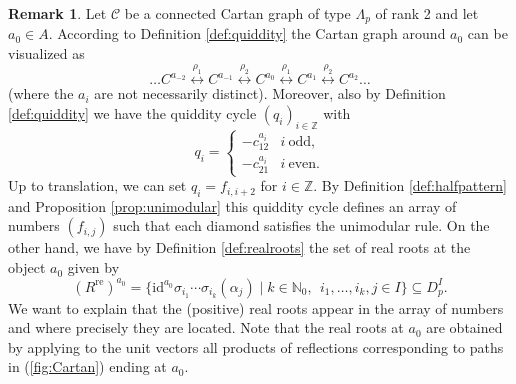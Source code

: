 \documentclass[11pt,a4paper]{amsart}
\theoremstyle{definition}
\newtheorem{Remark}[Lemma]{Remark}
\numberwithin{equation}{section}
\newcommand{\id }{\mathrm{id}}
\newcommand{\re }{^\mathrm{re}}
\newcommand{\rer }[1]{(R\re)^{#1}}
\newcommand{\s }{\sigma }
\newcommand{\Ri}{D_p}
\begin{document}
\begin{Remark} \label{rem:rootsinfrieze}
Let $\mathcal{C}$ be a connected 
Cartan graph of type
$\Lambda_p$ of rank 2 and let $a_0\in A$. 
According to Definition \ref{def:quiddity}
the Cartan graph around $a_0$ can be visualized
as 
\begin{equation} \label{fig:Cartan}
\ldots C^{a_{-2}} \stackrel{\rho_1}{\longleftrightarrow}
C^{a_{-1}} \stackrel{\rho_2}{\longleftrightarrow}
C^{a_0} \stackrel{\rho_1}{\longleftrightarrow}
C^{a_1} 
\stackrel{\rho_2}{\longleftrightarrow}
C^{a_2} \ldots
\end{equation}
(where the $a_i$ are not necessarily distinct). 
Moreover, also by Definition \ref{def:quiddity}
we have the quiddity cycle 
$(q_i)_{i\in \mathbb{Z}}$ with 
$$q_i= \left\{ \begin{array}{ll}
-c_{12}^{a_i} & i~\mathrm{odd}, \\
-c_{21}^{a_i} & i~\mathrm{even}.
\end{array} \right.
$$
Up to translation, 
we can set $q_i=f_{i,i+2}$ for $i\in \mathbb{Z}$. 
By Definition \ref{def:halfpattern}
and Proposition \ref{prop:unimodular}
this quiddity cycle defines an array of numbers
$(f_{i,j})$ such that each diamond satisfies 
the unimodular rule. 
On the other hand, we
have by Definition \ref{def:realroots}
the set of real roots at the object $a_0$ given 
by 
\[ \rer {a_0}=\{ \id ^{a_0} \s _{i_1}\cdots \s_{i_k}(\alpha_j) \mid
k\in \mathbb{N} _0,\:\: i_1,\dots,i_k,j\in I\}\subseteq \Ri^I.\]
We want to explain that the (positive) 
real roots appear in the array of numbers
and where precisely they are located.
Note that the real roots at $a_0$ 
are obtained by 
applying to the unit vectors 
all products of reflections 
corresponding to paths in (\ref{fig:Cartan})
ending at $a_0$. 


\end{Remark}
\end{document}
